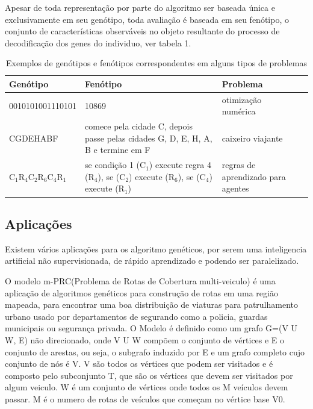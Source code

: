 Apesar de toda representação por parte do algoritmo ser baseada única e exclusivamente em seu genótipo, toda avaliação é baseada em seu fenótipo, o conjunto de características observáveis no objeto resultante do processo de decodificação dos genes do individuo, ver tabela 1.


	
\begin{table}[h]
	\centering
\vspace{1.0cm}
	\begin{tabular}{lp{3.0cm}lp{10.0cm}|}
		Genótipo & Fenótipo & Problema \\
		\hline                               
		0010101001110101 & 10869  & otimização numérica \\
		CGDEHABF & comece pela cidade C, depois passe pelas cidades G, D, E, H, A, B e termine em F  & caixeiro viajante \\
		C$_1$R$_4$C$_2$R$_6$C$_4$R$_1$ & se condição 1 (C$_1$) execute regra 4 (R$_4$), se (C$_2$) execute (R$_6$), se (C$_4$) execute (R$_1$)  & regras de aprendizado para agentes \\
	\end{tabular}
		\caption{Exemplos de genótipos e fenótipos correspondentes em alguns tipos de problemas \cite{DiogoCLucas}}
		
\end{table}	



\subsection{Aplicações}
Existem vários aplicações para os algoritmo genéticos, por serem uma inteligencia artificial não supervisionada, de rápido aprendizado e podendo ser paralelizado.

O modelo m-PRC(Problema de Rotas de Cobertura multi-veiculo) é uma aplicação de algoritmos genéticos para construção de rotas em uma região mapeada, para encontrar uma boa distribuição de viaturas para patrulhamento urbano usado por departamentos de segurando como a policia, guardas municipais ou segurança privada. 
O Modelo é definido como um grafo G=(V U W, E) não direcionado, onde V U W compõem o conjunto de vértices e E o conjunto de arestas, ou seja, o subgrafo induzido por E e um grafo completo cujo conjunto de nós é V. 
V são todos os vértices que podem ser visitados e é composto pelo subconjunto T, que são os vértices que devem ser visitados por algum veiculo. W é um conjunto de vértices onde todos os M veículos devem passar. M é o numero de rotas de veículos que começam no vértice base V0. 

